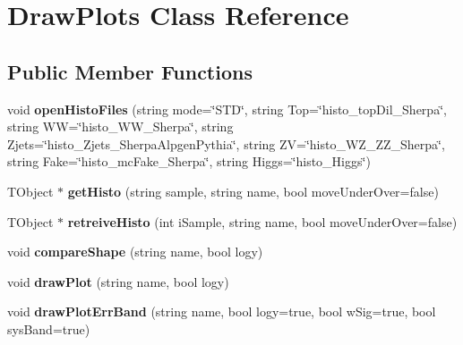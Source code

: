 \hypertarget{classDrawPlots}{
\section{DrawPlots Class Reference}
\label{classDrawPlots}
}
\subsection*{Public Member Functions}
\begin{DoxyCompactItemize}
\item 
\hypertarget{classDrawPlots_a35706f489716618b6202f481f215671a}{
void {\bfseries openHistoFiles} (string mode=\char`\"{}STD\char`\"{}, string Top=\char`\"{}histo\_\-topDil\_\-Sherpa\char`\"{}, string WW=\char`\"{}histo\_\-WW\_\-Sherpa\char`\"{}, string Zjets=\char`\"{}histo\_\-Zjets\_\-SherpaAlpgenPythia\char`\"{}, string ZV=\char`\"{}histo\_\-WZ\_\-ZZ\_\-Sherpa\char`\"{}, string Fake=\char`\"{}histo\_\-mcFake\_\-Sherpa\char`\"{}, string Higgs=\char`\"{}histo\_\-Higgs\char`\"{})}
\label{classDrawPlots_a35706f489716618b6202f481f215671a}

\item 
\hypertarget{classDrawPlots_adf3c098399e0dc0cb468a71f2d133cce}{
TObject $\ast$ {\bfseries getHisto} (string sample, string name, bool moveUnderOver=false)}
\label{classDrawPlots_adf3c098399e0dc0cb468a71f2d133cce}

\item 
\hypertarget{classDrawPlots_aea2c5e4a6cf887aea7cae8a669636c10}{
TObject $\ast$ {\bfseries retreiveHisto} (int iSample, string name, bool moveUnderOver=false)}
\label{classDrawPlots_aea2c5e4a6cf887aea7cae8a669636c10}

\item 
\hypertarget{classDrawPlots_ad41d048c3915a4b8267affa28751005e}{
void {\bfseries compareShape} (string name, bool logy)}
\label{classDrawPlots_ad41d048c3915a4b8267affa28751005e}

\item 
\hypertarget{classDrawPlots_a20c506acbe94f436246eadbb0afb5409}{
void {\bfseries drawPlot} (string name, bool logy)}
\label{classDrawPlots_a20c506acbe94f436246eadbb0afb5409}

\item 
\hypertarget{classDrawPlots_ac0a9cc9b400d70ddc5cecb856cce7429}{
void {\bfseries drawPlotErrBand} (string name, bool logy=true, bool wSig=true, bool sysBand=true)}
\label{classDrawPlots_ac0a9cc9b400d70ddc5cecb856cce7429}


\end{DoxyCompactItemize}

